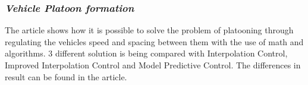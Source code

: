 \subsubsection{\textit{Vehicle Platoon formation}}
The article \cite{Tuchner2015VehicleControl} shows how it is possible to solve the problem of platooning through regulating the vehicles speed and spacing between them with the use of math and algorithms. 3 different solution is being compared with Interpolation Control, Improved Interpolation Control and Model Predictive Control. The differences in result can be found in the article.\par
% 